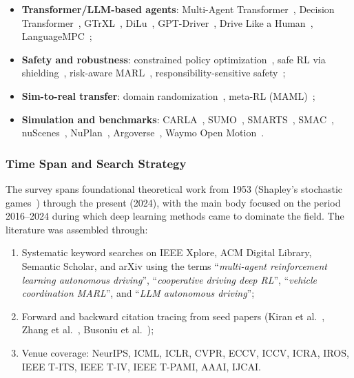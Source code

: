 \documentclass[12pt, a4paper]{article}
\begin{document}
\begin{itemize}[noitemsep]
        control~\cite{wei2019colight,wei2019presslight,zheng2019learning},
        cooperative lane change~\cite{wang2018urban},
        highway driving~\cite{isele2018navigating},
        mixed-autonomy traffic~\cite{wu2017flow,stern2018dissipation},
        POMDP planning~\cite{hubmann2018automated},
        game-theoretic driving~\cite{fisac2019hierarchical,sadigh2016planning,fridovich2020efficient},
        intent-aware planning~\cite{schwarting2019social,schwarting2021deep};
  \item \textbf{Transformer/LLM-based agents}: Multi-Agent
        Transformer~\cite{wen2022multi}, Decision Transformer~\cite{chen2021decision},
        GTrXL~\cite{parisotto2020stabilizing},
        DiLu~\cite{wen2023dilu},
        GPT-Driver~\cite{mao2023gpt},
        Drive Like a Human~\cite{fu2023drive},
        LanguageMPC~\cite{sha2023languagempc};
  \item \textbf{Safety and robustness}: constrained policy
        optimization~\cite{achiam2017constrained}, safe RL via
        shielding~\cite{alshiekh2018safe}, risk-aware
        MARL~\cite{prashanth2016variance}, responsibility-sensitive
        safety~\cite{shalev2016safe};
  \item \textbf{Sim-to-real transfer}: domain
        randomization~\cite{tobin2017domain}, meta-RL (MAML)~\cite{finn2017model};
  \item \textbf{Simulation and benchmarks}: CARLA~\cite{dosovitskiy2017carlaopenurbandriving},
        SUMO~\cite{krajzewicz2012recent}, SMARTS~\cite{zhou2020smarts},
        SMAC~\cite{samvelyan2019starcraft},
        nuScenes~\cite{caesar2020nuscenes}, NuPlan~\cite{caesar2021nuplan},
        Argoverse~\cite{chang2019argoverse},
        Waymo Open Motion~\cite{ettinger2021large}.
\end{itemize}

\subsubsection*{Time Span and Search Strategy}
The survey spans foundational theoretical work from 1953
(Shapley's stochastic games~\cite{shapley1953stochastic}) through the
present (2024), with the main body focused on the period 2016--2024 during
which deep learning methods came to dominate the field.  The literature was
assembled through:
\begin{enumerate}[noitemsep]
  \item Systematic keyword searches on IEEE Xplore, ACM Digital Library,
        Semantic Scholar, and arXiv using the terms
        ``\emph{multi-agent reinforcement learning autonomous driving}'',
        ``\emph{cooperative driving deep RL}'', ``\emph{vehicle coordination MARL}'',
        and ``\emph{LLM autonomous driving}'';
  \item Forward and backward citation tracing from seed papers
        (Kiran et al.~\cite{kiran2021deep}, Zhang et al.~\cite{zhang2021multi},
        Busoniu et al.~\cite{busoniu2008comprehensive});
  \item Venue coverage: NeurIPS, ICML, ICLR, CVPR, ECCV, ICCV,
        ICRA, IROS, IEEE T-ITS, IEEE T-IV, IEEE T-PAMI, AAAI, IJCAI.
\end{enumerate}
\end{document}
